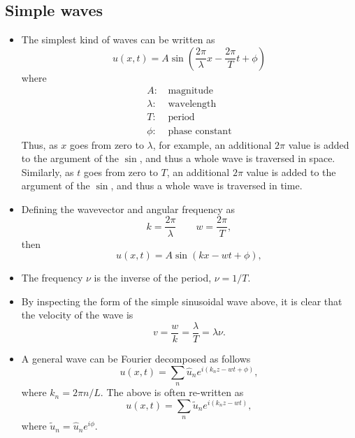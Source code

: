 \documentclass[11pt]{article}
\begin{document}
\subsection{Simple waves}
\begin{itemize}
\item The simplest kind of waves can be written as
\begin{equation}
    u(x,t) = A \sin\left ( \frac{2 \pi}{\lambda}x - \frac{2 \pi}{T} t +\phi \right)
\end{equation}
where
\begin{align*}
    A:&\, \text{magnitude} \\
    \lambda:&\, \text{wavelength} \\
    T:&\, \text{period} \\
    \phi:&\, \text{phase constant}
\end{align*}
Thus, as $x$ goes from zero to $\lambda$, for example, an additional $2\pi$ value is added to the argument of the $\sin$, and thus a whole wave is traversed in space. Similarly, as $t$ goes from zero to $T$, an additional $2\pi$ value is added to the argument of the $\sin$, and thus a whole wave is traversed in time.

\item Defining the wavevector and angular frequency as
\begin{equation}
    k = \frac{2 \pi}{\lambda} \qquad w = \frac{2 \pi}{T},
\end{equation}
then
\begin{equation}
    u(x,t) = A \sin(kx - wt + \phi),
\end{equation}

\item The frequency $\nu$ is the inverse of the period, $\nu = 1/T$.

\item By inspecting the form of the simple sinusoidal wave above, it is clear that the velocity of the wave is
\begin{equation}
    v = \frac{w}{k} = \frac{\lambda}{T} = \lambda \nu.
\end{equation}

\item A general wave can be Fourier decomposed as follows
\begin{equation}
    u(x,t) = \sum_n \hat{u}_n e^{i \left ( k_n z - wt + \phi \right )},
\end{equation}
where $k_n = 2 \pi n/ L$. The above is often re-written as
\begin{equation}
    u(x,t) = \sum_n \tilde{u}_n e^{i \left ( k_n z - wt \right )},
\end{equation}
where $\tilde{u}_n = \hat{u}_n e^{i\phi}$.


\end{itemize}
\end{document}
